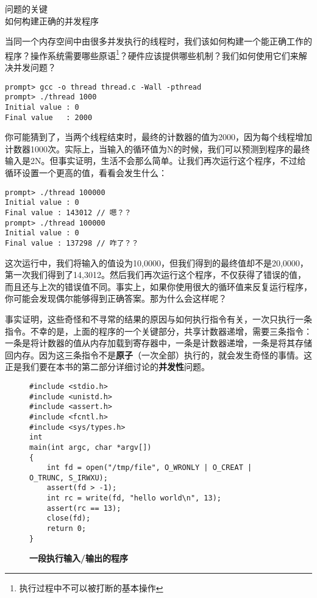 \begin{tcolorbox}[colframe=grey,colback= grey,arc=0pt,left=6pt,right=6pt,top=6pt,bottom=6pt,boxsep=0pt]
\begin{center}
问题的关键\\
如何构建正确的并发程序
\end{center}
当同一个内存空间中由很多并发执行的线程时，我们该如何构建一个能正确工作的程序？操作系统需要哪些原语\footnote{执行过程中不可以被打断的基本操作}？硬件应该提供哪些机制？我们如何使用它们来解决并发问题？
\end{tcolorbox}

\begin{verbatim}
prompt> gcc -o thread thread.c -Wall -pthread 
prompt> ./thread 1000 
Initial value : 0 
Final value   : 2000
\end{verbatim}

你可能猜到了，当两个线程结束时，最终的计数器的值为2000，因为每个线程增加计数器1000次。实际上，当输入的循环值为N的时候，我们可以预测到程序的最终输入是2N。但事实证明，生活不会那么简单。让我们再次运行这个程序，不过给循环设置一个更高的值，看看会发生什么：

\begin{verbatim}
prompt> ./thread 100000 
Initial value : 0 
Final value : 143012 // 嗯？？ 
prompt> ./thread 100000 
Initial value : 0 
Final value : 137298 // 咋了？？
\end{verbatim}

这次运行中，我们将输入的值设为10,0000，但我们得到的最终值却不是20,0000，第一次我们得到了14,3012。然后我们再次运行这个程序，不仅获得了错误的值，而且还与上次的错误值不同。事实上，如果你使用很大的循环值来反复运行程序，你可能会发现偶尔能够得到正确答案。那为什么会这样呢？

事实证明，这些奇怪和不寻常的结果的原因与如何执行指令有关，一次只执行一条指令。不幸的是，上面的程序的一个关键部分，共享计数器递增，需要三条指令：一条是将计数器的值从内存加载到寄存器中，一条是计数器递增，一条是将其存储回内存。因为这三条指令不是\textbf{原子}（一次全部）执行的，就会发生奇怪的事情。这正是我们要在本书的第二部分详细讨论的\textbf{并发性}问题。

\begin{figure}[ht]
\begin{lstlisting}
#include <stdio.h>
#include <unistd.h>
#include <assert.h>
#include <fcntl.h>
#include <sys/types.h>
int
main(int argc, char *argv[])
{
    int fd = open("/tmp/file", O_WRONLY | O_CREAT | O_TRUNC, S_IRWXU);
    assert(fd > -1);
    int rc = write(fd, "hello world\n", 13);
    assert(rc == 13);
    close(fd);
    return 0;
}
\end{lstlisting}
\caption{\textbf{一段执行输入/输出的程序}}
\end{figure}

